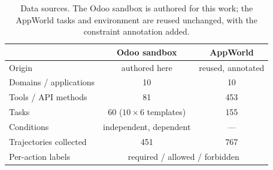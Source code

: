 \begin{table}[H]
\centering
\caption{Data sources. The Odoo sandbox is authored for this work; the AppWorld
tasks and environment are reused unchanged, with the constraint annotation added.}
\label{tab:bench_stats}
\small
\begin{tabular}{lcc}
\toprule
 & \textbf{Odoo sandbox} & \textbf{AppWorld} \\
\midrule
Origin                    & authored here      & reused, annotated \\
Domains / applications    & 10                 & 10 \\
Tools / API methods       & 81                 & 453 \\
Tasks                     & 60 ($10\times6$ templates) & 155 \\
Conditions                & independent, dependent & --- \\
Trajectories collected    & 451                & 767 \\
Per-action labels         & \multicolumn{2}{c}{required / allowed / forbidden} \\
\bottomrule
\end{tabular}
\end{table}
